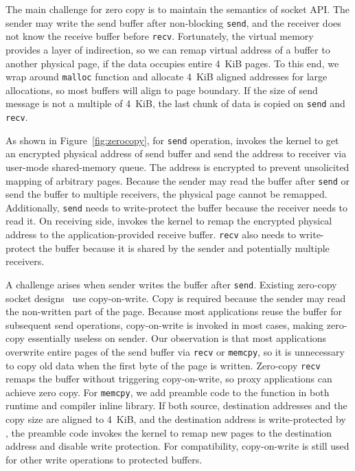 The main challenge for zero copy is to maintain the semantics of socket API. The sender may write the send buffer after non-blocking \texttt{send}, and the receiver does not know the receive buffer before \texttt{recv}.
Fortunately, the virtual memory provides a layer of indirection, so we can remap virtual address of a buffer to another physical page, if the data occupies entire 4~KiB pages.
To this end, we wrap around \texttt{malloc} function and allocate 4~KiB aligned addresses for large allocations, so most buffers will align to page boundary.
If the size of send message is not a multiple of 4~KiB, the last chunk of data is copied on \texttt{send} and \texttt{recv}.

As shown in Figure~\ref{fig:zerocopy}, for \texttt{send} operation, \libipc{} invokes the kernel to get an encrypted physical address of send buffer and send the address to receiver via user-mode shared-memory queue.
The address is encrypted to prevent unsolicited mapping of arbitrary pages.
Because the sender may read the buffer after \texttt{send} or send the buffer to multiple receivers, the physical page cannot be remapped.
Additionally, \texttt{send} needs to write-protect the buffer because the receiver needs to read it.
On receiving side, \libipc{} invokes the kernel to remap the encrypted physical address to the application-provided receive buffer.
\texttt{recv} also needs to write-protect the buffer because it is shared by the sender and potentially multiple receivers.

A challenge arises when sender writes the buffer after \texttt{send}.
Existing zero-copy socket designs~\cite{thadani1995efficient,chu1996zero} use copy-on-write. Copy is required because the sender may read the non-written part of the page.
Because most applications reuse the buffer for subsequent send operations, copy-on-write is invoked in most cases, making zero-copy essentially useless on sender.
Our observation is that most applications overwrite entire pages of the send buffer via \texttt{recv} or \texttt{memcpy}, so it is unnecessary to copy old data when the first byte of the page is written.
Zero-copy \texttt{recv} remaps the buffer without triggering copy-on-write, so proxy applications can achieve zero copy.
For \texttt{memcpy}, we add preamble code to the function in both \libipc{} runtime and compiler inline library. If both source, destination addresses and the copy size are aligned to 4~KiB, and the destination address is write-protected by \libipc{}, the preamble code invokes the kernel to remap new pages to the destination address and disable write protection.
For compatibility, copy-on-write is still used for other write operations to protected buffers.

